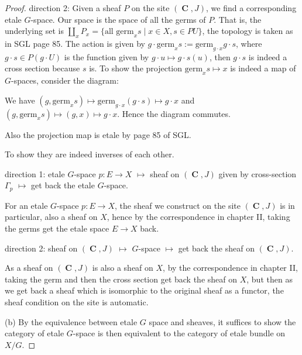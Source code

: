 \documentclass[a4paper]{article}
\DeclareMathOperator{\C}{\mathbf {C}}
\begin{document}
\begin{proof}
    

    direction 2: Given a sheaf $P$ on the site $(\C,J)$, we find a corresponding etale $G$-space. Our space is the space of all the germs of $P$. That is, the underlying set is $\coprod_{x}P_x=\{\text{all germ}_xs\mid x\in X,s\in PU\}$, the topology is taken as in SGL page 85. The action is given by $g\cdot \text{germ}_xs:=\text{germ}_{g\cdot x}g\cdot s$, where $g\cdot s\in P(g\cdot U)$ is the function given by $g\cdot u\mapsto g\cdot s(u)$, then $g\cdot s$ is indeed a cross section because $s$ is. To show the projection $\text{germ}_xs\mapsto x$ is indeed a map of $G$-spaces, consider the diagram:

    \begin{center}
    \end{center}

    We have $(g,\text{germ}_xs)\mapsto \text{germ}_{g\cdot x}(g\cdot s)\mapsto g\cdot x$ and $(g,\text{germ}_xs)\mapsto (g,x)\mapsto g\cdot x$. Hence the diagram commutes.

    Also the projection map is etale by page 85 of SGL.

    To show they are indeed inverses of each other. 

    direction 1: etale $G$-space $p:E\to X$ $\mapsto$ sheaf on $(\C,J)$ given by cross-section $\Gamma_p$ $\mapsto$ get back the etale $G$-space.

    For an etale $G$-space $p:E\to X$, the sheaf we construct on the site $(\C,J)$ is in particular, also a sheaf on $X$, hence by the correspondence in chapter II, taking the germs get the etale space $E\to X$ back.

    direction 2: sheaf on $(\C,J)$ $\mapsto$ $G$-space $\mapsto$ get back the sheaf on $(\C,J)$.

    As a sheaf on $(\C,J)$ is also a sheaf on $X$, by the correspondence in chapter II, taking the germ and then the cross section get back the sheaf on $X$, but then as we get back a sheaf which is isomorphic to the original sheaf as a functor, the sheaf condition on the site is automatic.
    
    (b) By the equivalence between etale $G$ space and sheaves, it suffices to show the category of etale $G$-space is then equivalent to the category of etale bundle on $X/G$.


\end{proof}
\end{document}
